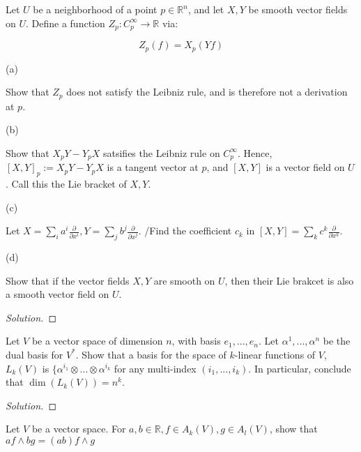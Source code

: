 \documentclass[10pt]{article}
\newenvironment{problem}[2][]{\begin{trivlist}
\item[\hskip \labelsep {\bfseries #1}\hskip \labelsep {\bfseries #2.}]}{\end{trivlist}}
\begin{document}
\begin{problem}{Question 4}

Let $U$ be a neighborhood of a point $p \in \mathbb{R}^n$, and let $X,Y$ be smooth vector fields on $U$. Define a function $Z_p : C_p^\infty \to \mathbb{R}$ via:

$$Z_p(f) = X_p(Yf) $$

(a)

Show that $Z_p$ does not satisfy the Leibniz rule, and is therefore not a derivation at $p$.

(b)

Show that $X_pY  - Y_pX$ satsifies the Leibniz rule on $C_p^\infty$. Hence, $[X,Y]_p := X_p Y - Y_pX$ is a tangent vector at $p$, and $[X,Y]$ is a vector field on $U$. Call this the Lie bracket of $X, Y$.

(c)

Let $X = \sum_i a^i \frac{\partial}{\partial x^i}, Y =  \sum_j b^j \frac{\partial}{\partial x^j}$. /Find the coefficient $c_k$ in $[X,Y] = \sum_k c^k \frac{\partial}{\partial x^k}$.

(d) 

Show that if the vector fields $X,Y$ are smooth on $U$, then their Lie brakcet is also a smooth vector field on $U$.
\end{problem}

\begin{proof}[Solution]


\end{proof}

\begin{problem}{Question 5}

Let $V$ be a vector space of dimension $n$, with basis $e_1,...,e_n$. Let $\alpha^1,...,\alpha^n$ be the dual basis for $V^*$. Show that a basis for the space of $k$-linear functions of $V$, $L_k(V)$ is $\{ \alpha^{i_1} \otimes ... \otimes \alpha^{i_k}$ for any multi-index $(i_1,...,i_k)$. In particular, conclude that $\dim(L_k(V)) = n^k$.  

\end{problem}

\begin{proof}[Solution]


\end{proof}

\begin{problem}{Question 6}

Let $V$ be a vector space. For $a,b \in \mathbb{R}, f \in A_k(V), g \in A_l(V)$, show that $af \wedge bg = (ab) f \wedge g$
\end{problem}
\end{document}
